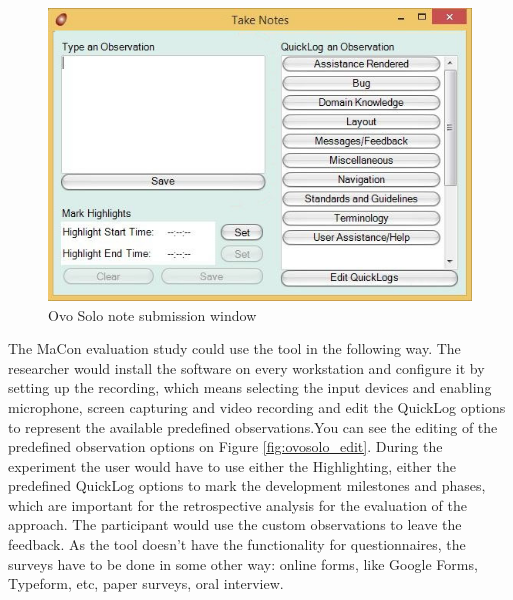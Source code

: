   \begin{figure}[htb]
 \centering
\includegraphics[width=\textwidth]{figures/ovosolo_note.jpg}
\caption{Ovo Solo note submission window}
\label{fig:ovosolo_note}
 \end{figure}
 
The MaCon evaluation study could use the tool in the following way. The researcher would install the software on every workstation and configure it by setting up the recording, which means selecting the input devices and enabling microphone, screen capturing and video recording and edit the QuickLog options to represent the available predefined observations.You can see the editing of the predefined observation options on Figure \ref{fig:ovosolo_edit}. During the experiment the user would have to use either the Highlighting, either the predefined QuickLog options to mark the development milestones and phases, which are important for the retrospective analysis for the evaluation of the approach. The participant would use the custom observations to leave the feedback. As the tool doesn't have the functionality for questionnaires, the surveys have to be done in some other way: online forms, like Google Forms, Typeform, etc, paper surveys, oral interview.\\

